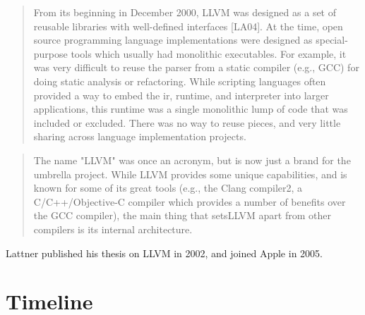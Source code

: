 \begin{quotation}
From its beginning in December 2000, 
LLVM was designed as a set of reusable libraries with well-defined interfaces 
[LA04]. At the time, open source programming language implementations were 
designed as special-purpose tools which usually had monolithic executables. For 
example, it was very difficult to reuse the parser from a static compiler (e.g., 
GCC) for doing static analysis or refactoring. While scripting languages often 
provided a way to embed the ir, runtime, and interpreter into larger applications, 
this runtime was a single monolithic lump of code that was included or excluded. 
There was no way to reuse pieces, and very little sharing across language 
implementation projects.\cite{aosa_vol1}
\end{quotation}

\begin{quotation}
The name "LLVM" was once an acronym, but is now just a brand for the 
umbrella project. While LLVM provides some unique capabilities, and is known for 
some of its great tools (e.g., the Clang compiler2, a C/C++/Objective-C compiler 
which provides a number of benefits over the GCC compiler), the main thing that 
setsLLVM apart from other compilers is its internal 
architecture.\cite[LLVM]{aosa_vol1}
\end{quotation}

Lattner published his thesis 
on LLVM in 2002, and joined Apple in 
2005.

\pagebreak\section{Timeline}

